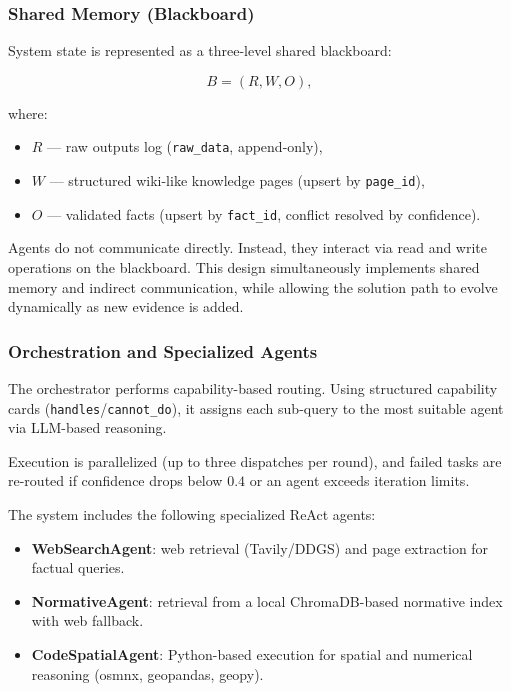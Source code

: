 \subsubsection{Shared Memory (Blackboard)}

System state is represented as a three-level shared blackboard:

\[
B = (R, W, O),
\]

where:

\begin{itemize}
    \item $R$ — raw outputs log (\texttt{raw\_data}, append-only),
    \item $W$ — structured wiki-like knowledge pages (upsert by \texttt{page\_id}),
    \item $O$ — validated facts (upsert by \texttt{fact\_id}, conflict resolved by confidence).
\end{itemize}

Agents do not communicate directly.
Instead, they interact via read and write operations on the blackboard.
This design simultaneously implements shared memory and indirect communication, while allowing the solution path to evolve dynamically as new evidence is added.

\subsubsection{Orchestration and Specialized Agents}

The orchestrator performs capability-based routing.
Using structured capability cards (\texttt{handles}/\texttt{cannot\_do}), it assigns each sub-query to the most suitable agent via LLM-based reasoning.

Execution is parallelized (up to three dispatches per round), and failed tasks are re-routed if confidence drops below $0.4$ or an agent exceeds iteration limits.

The system includes the following specialized ReAct agents:

\begin{itemize}
    \item \textbf{WebSearchAgent}: web retrieval (Tavily/DDGS) and page extraction for factual queries.
    \item \textbf{NormativeAgent}: retrieval from a local ChromaDB-based normative index with web fallback.
    \item \textbf{CodeSpatialAgent}: Python-based execution for spatial and numerical reasoning (osmnx, geopandas, geopy).
\end{itemize}

